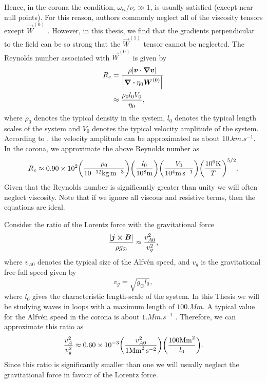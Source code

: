 Hence, in the corona the condition, $\omega_{ci}/\nu_i\gg1$, is usually satisfied (except near null points). For this reason, authors commonly neglect all of the viscosity tensors except $\vec{W}^{(0)}$ \citep{Hollweg1986b, MacTaggart2017}. However, in this thesis, we find that the gradients perpendicular to the field can be so strong that the $\vec{W}^{(1)}$ tensor cannot be neglected. The Reynolds number associated with $\vec{W}^{(0)}$ is given by
\begin{equation}
    \begin{aligned}
    R_e&=\frac{\rho\abs{\boldsymbol{v}\cdot\grad{\boldsymbol{v}}}}{\abs{\div{\eta_0\boldsymbol{W}^{(0)}}}} \\
    &\approx\frac{\rho_0 l_0V_0}{\eta_0},
    \end{aligned}
\end{equation}
where $\rho_0$ denotes the typical density in the system, $l_0$ denotes the typical length scales of the system and $V_0$ denotes the typical velocity amplitude of the system. According to \citet{McIntosh2011,McIntosh2012}, the velocity amplitude can be approximated as about $10\si{.km.s^{-1}}$. In the corona, we approximate the above Reynolds number as
\begin{equation}
    \label{eq:visc_reynolds_number}
    R_e\approx  0.90\times10^2\qty(\frac{\rho_0}{10^{-12}\si{kg.m^{-3}}})\qty(\frac{l_0}{10^8\si{.m}})\qty(\frac{V_0}{10^4\si{.m.s^{-1}}})\qty(\frac{10^6\si{.K}}{T})^{5/2}.
\end{equation}
Given that the Reynolds number is significantly greater than unity we will often neglect viscosity. Note that if we ignore all viscous and resistive terms, then the equations are ideal.

Consider the ratio of the Lorentz force with the gravitational force
\[\frac{|\boldsymbol{j}\cross\boldsymbol{B}|}{\rho g_\odot}\approx \frac{v_{A0}^2}{v_g^2},\]
where $v_{A0}$ denotes the typical size of the Alfv\'en speed, and $v_g$ is the gravitational free-fall speed given by
\begin{equation}
    v_g = \sqrt{g_\odot l_0},
\end{equation}
where $l_0$ gives the characteristic length-scale of the system. In this Thesis we will be studying waves in loops with a maximum length of $100\si{.Mm}$. A typical value for the Alfv\'en speed in the corona is about $1\si{.Mm.s^{-1}}$ \citep{McIntosh2011,McIntosh2012}. Therefore, we can approximate this ratio as
\begin{equation}
    \label{eq:ignore_gravity}
    \frac{v_A^2}{v_g^2}\approx 0.60\times 10^{-3}\qty(\frac{v_{A0}^2}{1\si{.Mm^2.s^{-2}}})\qty(\frac{100 \si{.Mm^2}}{l_0}).
\end{equation}
Since this ratio is significantly smaller than one we will usually neglect the gravitational force in favour of the Lorentz force.

